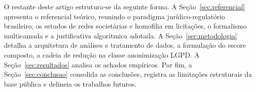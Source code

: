O restante deste artigo estrutura-se da seguinte forma. A Seção~\ref{sec:referencial} apresenta o referencial teórico, reunindo o paradigma  jurídico-regulatório brasileiro, os estudos de redes societárias e homofilia em licitações, o formalismo multicamada e a justificativa algorítmica adotada. A Seção~\ref{sec:metodologia} detalha a arquitetura de análises e tratamento de dados, a formulação do escore composto, a cadeia de redução na classe anonimização LGPD. A Seção~\ref{sec:resultados} analisa os achados empíricos. Por fim, a Seção~\ref{sec:conclusao} consolida as conclusões, registra as limitações estruturais da base pública e delineia os trabalhos futuros.
